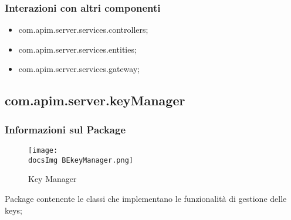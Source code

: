 {{{    \subsubsection{Interazioni con altri componenti}
    \begin{itemize}
    \item com.apim.server.services.controllers;
    \item com.apim.server.services.entities;
    \item com.apim.server.services.gateway;
    \end{itemize}
  }
    \subsection{com.apim.server.keyManager}{
    \subsubsection{Informazioni sul Package}
        \begin{figure}[ht]
          \centering
          \texttt{[image: \\docsImg BEkeyManager.png]}
          \caption{Key Manager}
          \label{Key Manager}
        \end{figure}
        Package contenente le classi che implementano le funzionalità di gestione delle keys;
}}}
